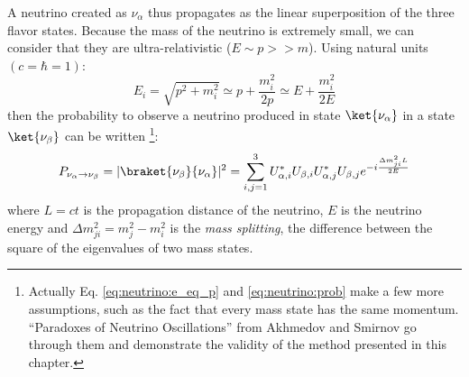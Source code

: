 A neutrino created as $\nu_\alpha$ thus propagates as the linear superposition of the three flavor states. Because the mass of the neutrino is extremely small, we can consider that they are ultra-relativistic ($E \sim p >> m$). Using natural units $(c = \hbar = 1)$:
\begin{equation}
  \label{eq:neutrino:e_eq_p}
  E_i = \sqrt{p^2 + m_i^2} \simeq p + \frac{m_i^2}{2p} \simeq E + \frac{m_i^2}{2E}
\end{equation}
then the probability to observe a neutrino produced in state $\ket{\nu_\alpha}$ in a state $\ket{\nu_\beta}$ can be written \footnote{Actually Eq. \ref{eq:neutrino:e_eq_p} and \ref{eq:neutrino:prob} make a few more assumptions, such as the fact that every mass state has the same momentum. ``Paradoxes of Neutrino Oscillations'' from Akhmedov and Smirnov \cite{akhmedov_paradoxes_2009} go through them and demonstrate the validity of the method presented in this chapter.}:
\begin{equation}
  \label{eq:neutrino:prob}
  P_{\nu_\alpha \rightarrow \nu_\beta} = | \braket{\nu_\beta}{\nu_\alpha} |^2 = \sum_{i,j=1}^3 U^*_{\alpha,i} U_{\beta,i} U^*_{\alpha, j} U_{\beta, j} e^{-i \frac{\Delta m^2_{ji} L}{2E}}
\end{equation}
where $L = ct$ is the propagation distance of the neutrino, $E$ is the neutrino energy and $\Delta m^2_{ji} = m^2_j - m^2_i$ is the \textit{mass splitting}, the difference between the square of the eigenvalues of two mass states.

